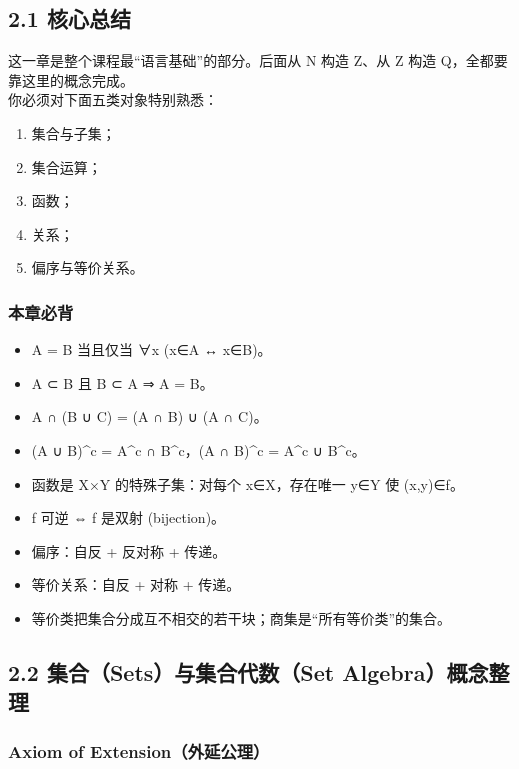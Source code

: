 \documentclass[
  11pt,
]{article}
\providecommand{\tightlist}{%
  \setlength{\itemsep}{0pt}\setlength{\parskip}{0pt}}
\begin{document}
\subsection{2.1 核心总结}\label{ux6838ux5fc3ux603bux7ed3-1}

这一章是整个课程最``语言基础''的部分。后面从 N 构造 Z、从 Z 构造
Q，全都要靠这里的概念完成。\\
你必须对下面五类对象特别熟悉：

\begin{enumerate}
\def\labelenumi{\arabic{enumi}.}
\tightlist
\item
  集合与子集；
\item
  集合运算；
\item
  函数；
\item
  关系；
\item
  偏序与等价关系。
\end{enumerate}

\subsubsection{本章必背}\label{ux672cux7ae0ux5fc5ux80cc}

\begin{itemize}
\tightlist
\item
  A = B 当且仅当 ∀x (x∈A ↔ x∈B)。
\item
  A ⊂ B 且 B ⊂ A ⇒ A = B。
\item
  A ∩ (B ∪ C) = (A ∩ B) ∪ (A ∩ C)。
\item
  (A ∪ B)\^{}c = A\^{}c ∩ B\^{}c，(A ∩ B)\^{}c = A\^{}c ∪ B\^{}c。
\item
  函数是 X×Y 的特殊子集：对每个 x∈X，存在唯一 y∈Y 使 (x,y)∈f。
\item
  f 可逆 ⇔ f 是双射 (bijection)。
\item
  偏序：自反 + 反对称 + 传递。
\item
  等价关系：自反 + 对称 + 传递。
\item
  等价类把集合分成互不相交的若干块；商集是``所有等价类''的集合。
\end{itemize}

\subsection{2.2 集合（Sets）与集合代数（Set
Algebra）概念整理}\label{ux96c6ux5408setsux4e0eux96c6ux5408ux4ee3ux6570set-algebraux6982ux5ff5ux6574ux7406}

\subsubsection{Axiom of
Extension（外延公理）}\label{axiom-of-extensionux5916ux5ef6ux516cux7406}
\end{document}
